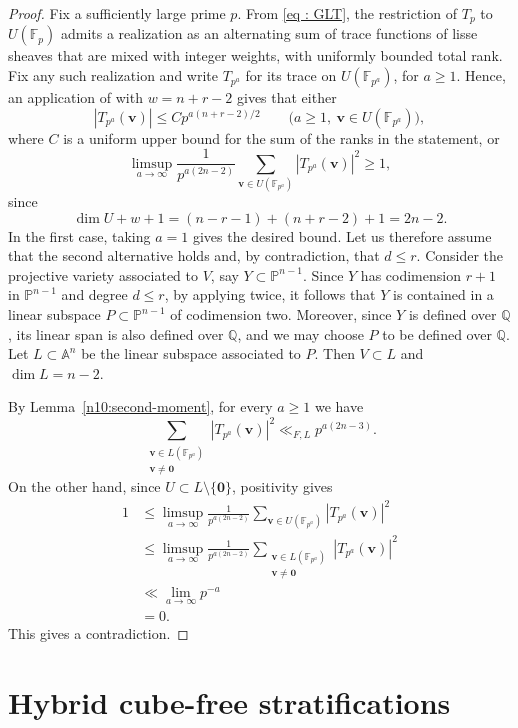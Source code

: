\documentclass[a4paper,11pt, twoside,reqno]{amsart}
\theoremstyle{plain}
\theoremstyle{definition}
\theoremstyle{remark}
\newcommand{\bfv}{\bm{v}}
\newcommand{\QQ}{\mathbb{Q}}
\renewcommand{\le}{\leqslant}
\renewcommand{\ge}{\geqslant}
\newcommand{\FF}{\mathbb{F}}
\numberwithin{equation}{section}
\begin{document}
\begin{proof}
Fix a sufficiently large prime $p$.
From \eqref{eq : GLT}, the restriction of
$T_p$ to $U(\FF_p)$ admits a realization as an alternating sum of
trace functions of lisse sheaves that are mixed with
integer weights, with uniformly bounded total rank.
Fix any such realization and write $T_{p^a}$ for its trace on
$U(\FF_{p^a})$, for $a\ge1$.
Hence, an application of
\cite[Theorem~3.5 and Remark~3.6]{Xu20}
with $w=n+r-2$ gives that either
\[
|T_{p^a}(\bfv)|\le Cp^{a(n+r-2)/2}
\qquad
\bigl(a\ge1,\ \bfv\in U(\FF_{p^a})\bigr),
\]
where $C$ is a uniform upper bound for the sum of the
ranks in the statement, or
\[
\limsup_{a\to\infty}
\frac{1}{p^{a(2n-2)}}
\sum_{\bfv\in U(\FF_{p^a})}
|T_{p^a}(\bfv)|^2
\ge1,
\]
since
\[
\dim U+w+1
=(n-r-1)+(n+r-2)+1
=2n-2.
\]
In the first case, taking $a=1$ gives the desired bound.
Let us therefore assume that the second alternative holds and,
by contradiction, that $d\le r$.
Consider the projective variety associated to $V$, say
$Y\subset\mathbb{P}^{n-1}$.
Since $Y$ has codimension $r+1$ in $\mathbb{P}^{n-1}$ and
degree $d\le r$, by applying
\cite[Lemma~3 and Corollary]{Swi73} twice, it follows that
$Y$ is contained in a linear subspace
$P\subset\mathbb{P}^{n-1}$ of codimension two.
Moreover, since $Y$ is defined over $\QQ$, its linear span
is also defined over $\QQ$, and we may choose $P$ to be
defined over $\QQ$.
Let $L\subset\mathbb{A}^{n}$ be the linear subspace
associated to $P$.
Then $V\subset L$ and $\dim L=n-2$.

By Lemma~\ref{n10:second-moment}, for every $a\ge1$ we have
\[
\sum_{\substack{
\bfv\in L(\FF_{p^a})\\
\bfv\ne\bm0}}
|T_{p^a}(\bfv)|^2
\ll_{F,L}p^{a(2n-3)}.
\]
On the other hand, since
$U\subset L\setminus\{\bm0\}$, positivity gives
\[
\begin{split}
1
&\le
\limsup_{a\to\infty}
\frac{1}{p^{a(2n-2)}}
\sum_{\bfv\in U(\FF_{p^a})}
|T_{p^a}(\bfv)|^2 \\
&\le
\limsup_{a\to\infty}
\frac{1}{p^{a(2n-2)}}
\sum_{\substack{
\bfv\in L(\FF_{p^a})\\
\bfv\ne\bm0}}
|T_{p^a}(\bfv)|^2
\\
&\ll \lim_{a\rightarrow\infty} p^{-a}
\\& =0.
\end{split}
\]
This gives a contradiction.
\end{proof}





\section{Hybrid cube-free stratifications}
\label{sec:MarkV-construction}
\end{document}
